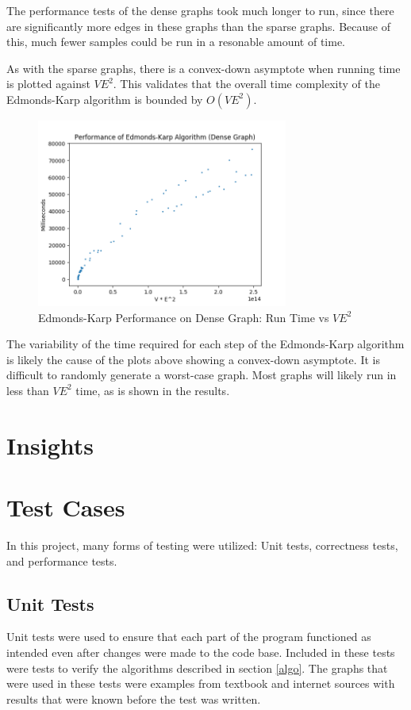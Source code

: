 \documentclass[conference]{IEEEtran}
\begin{document}
The performance tests of the dense graphs took much longer to run, since there are significantly
more edges in these graphs than the sparse graphs. Because of this, much fewer samples could be 
run in a resonable amount of time. 

As with the sparse graphs, there is a convex-down asymptote when running time is plotted against
$VE^2$. This validates that the overall time complexity of the Edmonds-Karp algorithm is bounded 
by $O(VE^2)$.
\begin{figure}
	\centering
	\includegraphics[width=3.25in]{Edmonds-Karp_Dense.png}
	\caption{Edmonds-Karp Performance on Dense Graph: Run Time vs $VE^2$}
	\label{ff_perf_dense}
\end{figure}

The variability of the time required for each step of the Edmonds-Karp algorithm is likely the 
cause of the plots above showing a convex-down asymptote. It is difficult to randomly generate
a worst-case graph. Most graphs will likely run in less than $VE^2$ time, as is shown in the 
results.

\section{Insights}

\section{Test Cases} %
In this project, many forms of testing were utilized: Unit tests, correctness tests,
and performance tests.

\subsection{Unit Tests}
Unit tests were used to ensure that each part of the program functioned as intended even after
changes were made to the code base. Included in these tests were tests to verify the algorithms
described in section \ref{algo}. The graphs that were used in these tests were examples from 
textbook and internet sources with results that were known before the test was written. 
\end{document}
